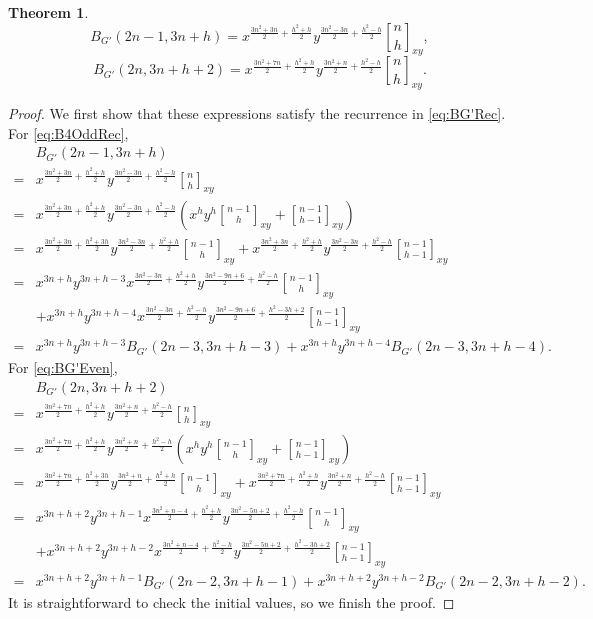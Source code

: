 \documentclass[12pt]{amsart}
\newtheorem{theorem}{Theorem}[section]
\theoremstyle{definition}
\theoremstyle{remark}
\numberwithin{equation}{section}
\begin{document}
\begin{theorem}
\begin{equation}\label{eq:BG'Odd}
B_{G'}(2n-1,3n+h)=x^{\frac{3n^2+3n}{2}+\frac{h^2+h}{2}}y^{\frac{3n^2-3n}{2}+\frac{h^2-h}{2}}{n\brack h}_{xy},
\end{equation}
\begin{equation}\label{eq:BG'Even}
B_{G'}(2n,3n+h+2)=x^{\frac{3n^2+7n}{2}+\frac{h^2+h}{2}}y^{\frac{3n^2+n}{2}+\frac{h^2-h}{2}}{n\brack h}_{xy}.
\end{equation}
\end{theorem}

\begin{proof}
We first show that these expressions satisfy the recurrence in \eqref{eq:BG'Rec}. For \eqref{eq:B4OddRec},
\begin{align*}
&B_{G'}(2n-1,3n+h)\\
=&x^{\frac{3n^2+3n}{2}+\frac{h^2+h}{2}}y^{\frac{3n^2-3n}{2}+\frac{h^2-h}{2}}{n\brack h}_{xy}\\
=&x^{\frac{3n^2+3n}{2}+\frac{h^2+h}{2}}y^{\frac{3n^2-3n}{2}+\frac{h^2-h}{2}}\left(x^hy^h{n-1\brack h}_{xy}+{n-1\brack h-1}_{xy}\right)\\
=&x^{\frac{3n^2+3n}{2}+\frac{h^2+3h}{2}}y^{\frac{3n^2-3n}{2}+\frac{h^2+h}{2}}{n-1\brack h}_{xy}+x^{\frac{3n^2+3n}{2}+\frac{h^2+h}{2}}y^{\frac{3n^2-3n}{2}+\frac{h^2-h}{2}}{n-1\brack h-1}_{xy}\\
=&x^{3n+h}y^{3n+h-3}x^{\frac{3n^2-3n}{2}+\frac{h^2+h}{2}}y^{\frac{3n^2-9n+6}{2}+\frac{h^2-h}{2}}{n-1\brack h}_{xy}\\
&+x^{3n+h}y^{3n+h-4}x^{\frac{3n^2-3n}{2}+\frac{h^2-h}{2}}y^{\frac{3n^2-9n+6}{2}+\frac{h^2-3h+2}{2}}{n-1\brack h-1}_{xy}\\
=&x^{3n+h}y^{3n+h-3}B_{G'}(2n-3,3n+h-3)+x^{3n+h}y^{3n+h-4}B_{G'}(2n-3,3n+h-4).
\end{align*}
For \eqref{eq:BG'Even},
\begin{align*}
&B_{G'}(2n,3n+h+2)\\
=&x^{\frac{3n^2+7n}{2}+\frac{h^2+h}{2}}y^{\frac{3n^2+n}{2}+\frac{h^2-h}{2}}{n\brack h}_{xy}\\
=&x^{\frac{3n^2+7n}{2}+\frac{h^2+h}{2}}y^{\frac{3n^2+n}{2}+\frac{h^2-h}{2}}\left(x^hy^h{n-1\brack h}_{xy}+{n-1\brack h-1}_{xy}\right)\\
=&x^{\frac{3n^2+7n}{2}+\frac{h^2+3h}{2}}y^{\frac{3n^2+n}{2}+\frac{h^2+h}{2}}{n-1\brack h}_{xy}+x^{\frac{3n^2+7n}{2}+\frac{h^2+h}{2}}y^{\frac{3n^2+n}{2}+\frac{h^2-h}{2}}{n-1\brack h-1}_{xy}\\
=&x^{3n+h+2}y^{3n+h-1}x^{\frac{3n^2+n-4}{2}+\frac{h^2+h}{2}}y^{\frac{3n^2-5n+2}{2}+\frac{h^2-h}{2}}{n-1\brack h}_{xy}\\
&+x^{3n+h+2}y^{3n+h-2}x^{\frac{3n^2+n-4}{2}+\frac{h^2-h}{2}}y^{\frac{3n^2-5n+2}{2}+\frac{h^2-3h+2}{2}}{n-1\brack h-1}_{xy}\\
=&x^{3n+h+2}y^{3n+h-1}B_{G'}(2n-2,3n+h-1)+x^{3n+h+2}y^{3n+h-2}B_{G'}(2n-2,3n+h-2).
\end{align*}
It is straightforward to check the initial values, so we finish the proof.
\end{proof}
\end{document}
